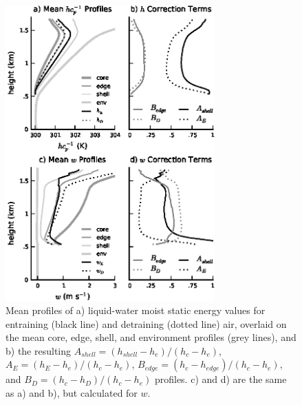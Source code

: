 \documentclass[12pt]{article}
\begin{document}
\begin{figure}[t]
  \noindent\includegraphics[width=19pc]{./figures/profile_plots}
  \caption{Mean profiles of a) liquid-water moist static energy values for 
  entraining (black line) and detraining (dotted line) air, overlaid on the 
  mean core, edge, shell, and environment profiles (grey lines), and b) the 
  resulting $A_{shell} = (h_{shell} - h_e)/(h_c - h_e)$, 
  $A_E = (h_E - h_e)/(h_c - h_e)$,  
  $B_{edge} = (h_c - h_{edge})/(h_c - h_e)$, and
  $B_D = (h_c - h_D)/(h_c - h_e)$ profiles.  c) and d) are the same 
  as a) and b), but calculated for $w$. 
}
  \label{fig:profile_plots}
\end{figure}
\end{document}
